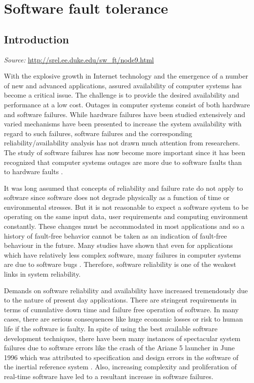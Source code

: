 \documentclass[a4paper, 11pt]{article}
\begin{document}
\section{Software fault tolerance}
\subsection{Introduction}
\textit{Source:} \url{http://srel.ee.duke.edu/sw_ft/node9.html}

With the explosive growth in Internet technology and the emergence of a number of new and advanced applications, assured availability of computer systems has become a critical issue. The challenge is to provide the desired availability and performance at a low cost.
Outages in computer systems consist of both hardware and software failures. While hardware failures have been studied extensively and varied mechanisms have been presented to increase the system availability with regard to such failures, software failures and the corresponding reliability/availability analysis has not drawn much attention from researchers. The study of software failures has now become more important since it has been recognized that computer systems outages are more due to software faults than to hardware faults \citep{gray1991high, sullivan1991software}.

It was long assumed that concepts of reliability and failure rate do not apply to software since software does not degrade physically as a function of time or environmental stresses. But it is not reasonable to expect a software system to be operating on the same input data, user requirements and computing environment constantly. These changes must be accommodated in most applications and so a history of fault-free behavior cannot be taken as an indication of fault-free behaviour in the future. Many studies have shown that even for applications which have relatively less complex software, many failures in computer systems are due to software bugs \citep{pradhan1996fault}. Therefore, software reliability is one of the weakest links in system reliability.

Demands on software reliability and availability have increased tremendously due to the nature of present day applications. There are stringent requirements in terms of cumulative down time and failure free operation of software. In many cases, there are serious consequences like huge economic losses or risk to human life if the software is faulty. In spite of using the best available software development techniques, there have been many instances of spectacular system failures due to software errors like the crash of the Ariane 5 launcher in June 1996 which was attributed to specification and design errors in the software of the inertial reference system \citep{lions1996ariane}. Also, increasing complexity and proliferation of real-time software have led to a resultant increase in software failures.
\end{document}
